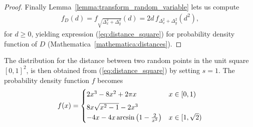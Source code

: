 \begin{proof}
  Finally Lemma~\ref{lemma:transform_random_variable} lets us compute
  \begin{align*}%
  f_D(d) = f_{\sqrt{\Delta_x^2 + \Delta_y^2}}(d) = 2d\, f_{\Delta_x^2 +
    \Delta_y^2}(d^2),
  \end{align*}
  for $d \geq 0$, yielding expression (\ref{eq:distance_square}) for
   probability density function of $D$
   (Mathematica~\ref{mathematica:distances}). 
\end{proof}

The distribution for the distance between two random points in the
unit square $[0,1]^2$, is then obtained from
(\ref{eq:distance_square}) by setting $s=1$. The probability
density function $f$ becomes
  \begin{align}\label{eq:distance_unit_square}
    f(x) = %
      \begin{cases} 
        2 x^3 - 8 x^2 +  2 \pi x 
          & x \in [0,1) \vspace{0.15cm}\\ 
        8x \sqrt{x^2-1}-2x^3\\ 
        -4x- 4x\arcsin\left(1-\frac{2}{x^2}\right) 
          & x \in [1,\sqrt{2})
           \end{cases}
  \end{align}
 

